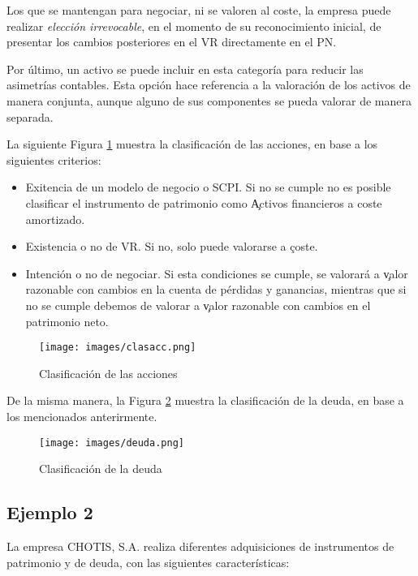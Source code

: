 Los que se mantengan para negociar, ni se valoren al coste, la empresa puede realizar \textit{elección irrevocable}, en el momento de su reconocimiento inicial, de presentar los cambios posteriores en el VR directamente en el PN.

Por último, un activo se puede incluir en esta categoría para reducir las asimetrías contables. Esta opción hace referencia a la valoración de los activos de manera conjunta, aunque alguno de sus componentes se pueda valorar de manera separada.

La siguiente Figura \ref{fig:Acciones} muestra la clasificación de las acciones, en base a los siguientes criterios:

\begin{itemize}
    \item Exitencia de un modelo de negocio o SCPI. Si no se cumple no es posible clasificar el instrumento de patrimonio como \c{Activos financieros a coste amortizado}.
    \item Existencia o no de VR. Si no, solo puede valorarse a \c{coste}.  
    \item Intención o no de negociar. Si esta condiciones se cumple, se valorará a \c{valor razonable con cambios en la cuenta de pérdidas y ganancias}, mientras que si no se cumple debemos de valorar a \c{valor razonable con cambios en el patrimonio neto}.
\end{itemize}

\begin{figure}[H]
    \centering
    \texttt{[image: images/clasacc.png]}
    \caption{Clasificación de las acciones}
    \label{fig:Acciones}
\end{figure}

De la misma manera, la Figura \ref{fig:Deuda} muestra la clasificación de la deuda, en base a los mencionados anterirmente.

\begin{figure}[H]
    \centering
    \texttt{[image: images/deuda.png]}
    \caption{Clasificación de la deuda}
    \label{fig:Deuda}
\end{figure}

\subsection*{Ejemplo 2}

La empresa CHOTIS, S.A. realiza diferentes adquisiciones de instrumentos de patrimonio y de deuda, con las siguientes características:

